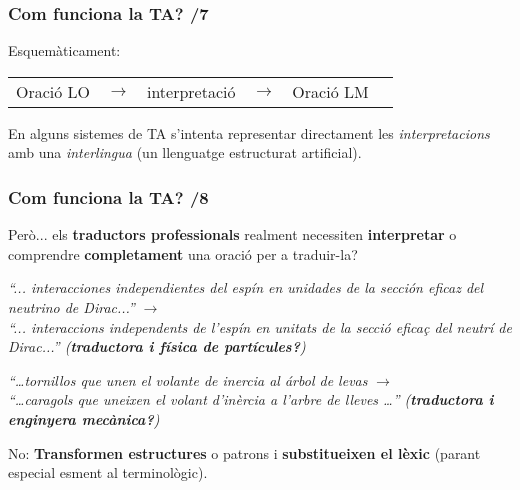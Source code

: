 \documentclass{beamer}
\newcommand{\empha}[1]{\emph{#1}\/}
\begin{document}

\begin{frame}
\frametitle{ Com funciona la TA? /7}

Esquemàticament:

{
{
\begin{center}
\begin{tabular}{cccccc}
\parbox{1.8cm}{Oració LO}
& $\to$ 
& interpretació 
& $\to$ 
& \parbox{1.8cm}{Oració LM} \\ 
\end{tabular}
\end{center}
}

{ En alguns sistemes de TA s'intenta representar directament les
  \empha{interpretacions} amb una \empha{interlingua} (un llenguatge estructurat
  artificial).}  }
\end{frame}

\begin{frame}
\frametitle{ Com funciona la TA? /8}

 { {Però... els \textbf{traductors
      professionals} realment necessiten \textbf{interpretar} o
    comprendre \textbf{completament} una oració per a
    traduir-la?}

{
\begin{center}
  \textsl{``... interacciones independientes del espín en unidades de la
  sección eficaz del neutrino de Dirac...''} $\to$ \\
  \textsl{\empha{``... interaccions independents de l'espín en unitats de la secció
  eficaç del neutrí de Dirac...''} (\textbf{traductora i física de partícules?})}
\end{center}
}
{
\begin{center}
\textsl{``\ldots tornillos que unen el volante de inercia al árbol de levas}
 $\to$ \\
\textsl{\empha{``\ldots caragols que uneixen el volant d'inèrcia a l'arbre
de lleves \ldots''} (\textbf{traductora i enginyera mecànica?})}
\end{center}
} {No: \textbf{Transformen estructures} o patrons i
\textbf{substitueixen el lèxic} (parant especial esment al
terminològic).} 
}

\end{frame}

\end{document}
